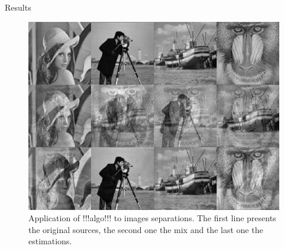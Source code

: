 \documentclass{beamer}
\begin{document}
\begin{frame}{}
\begin{columns}[T]
\begin{column}{.48\linewidth}
\begin{block}{Results}
\begin{figure}
\label{imres}
\centering
\includegraphics[width=18cm]{unmix_images}
\caption{Application of !!!algo!!! to images separations. The first line presents the original sources, the second one the mix and the last one the estimations.}
\end{figure}
\end{block}

\end{column}
\end{columns}

\end{frame}
\end{document}

